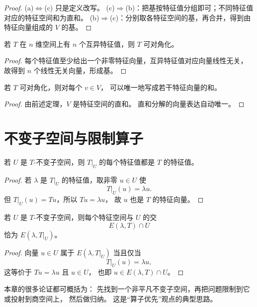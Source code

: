 \begin{proof}
(a)$\Leftrightarrow$(c) 只是定义改写。
(c)$\Rightarrow$(b)：把基按特征值分组即可；不同特征值对应的特征空间和为直和。
(b)$\Rightarrow$(c)：分别取各特征空间的基，再合并，得到由特征向量组成的 $V$ 的基。
\end{proof}

\begin{corollary}
若 $T$ 在 $n$ 维空间上有 $n$ 个互异特征值，则 $T$ 可对角化。
\end{corollary}

\begin{proof}
每个特征值至少给出一个非零特征向量，互异特征值对应向量线性无关，
故得到 $n$ 个线性无关向量，形成基。
\end{proof}

\begin{proposition}
若 $T$ 可对角化，则对每个 $v\in V$，
可以唯一地写成若干特征向量的和。
\end{proposition}

\begin{proof}
由前述定理，$V$ 是特征空间的直和。
直和分解的向量表达自动唯一。
\end{proof}

\section{不变子空间与限制算子}

\begin{proposition}
若 $U$ 是 $T$-不变子空间，则 $T|_U$ 的每个特征值都是 $T$ 的特征值。
\end{proposition}

\begin{proof}
若 $\lambda$ 是 $T|_U$ 的特征值，取非零 $u\in U$ 使
\[
T|_U(u)=\lambda u.
\]
但 $T|_U(u)=Tu$，所以 $Tu=\lambda u$，
故 $u$ 也是 $T$ 的特征向量。
\end{proof}

\begin{proposition}
若 $U$ 是 $T$-不变子空间，则每个特征空间与 $U$ 的交
\[
E(\lambda,T)\cap U
\]
恰为 $E(\lambda,T|_U)$。
\end{proposition}

\begin{proof}
向量 $u\in U$ 属于 $E(\lambda,T|_U)$ 当且仅当
\[
T|_U(u)=\lambda u,
\]
这等价于 $Tu=\lambda u$ 且 $u\in U$，
也即 $u\in E(\lambda,T)\cap U$。
\end{proof}

\begin{remark}
本章的很多论证都可概括为：
先找到一个非平凡不变子空间，再把问题限制到它或投射到商空间上，
然后做归纳。
这是“算子优先”观点的典型思路。
\end{remark}

